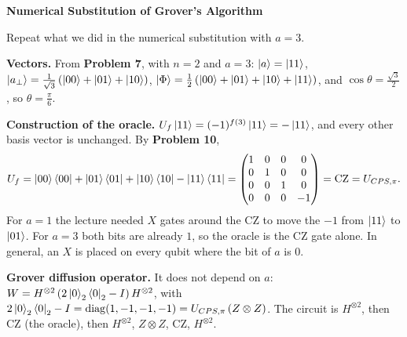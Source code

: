 \documentclass[a4paper, 10pt]{article}
\begin{document}
\begin{problem}
\textbf{Numerical Substitution of Grover's Algorithm}
\par Repeat what we did in the numerical substitution with \( a = 3 \).
\end{problem}

\begin{solution}
	\noindent \textbf{Vectors.} From \textbf{Problem 7}, with \( n = 2 \) and \( a = 3 \): \( \ket{a} = \ket{11} \), \( \ket{a_\perp} = \tfrac{1}{\sqrt{3}}\left(\ket{00} + \ket{01} + \ket{10}\right) \), \( \ket{\Phi} = \tfrac{1}{2}\left(\ket{00} + \ket{01} + \ket{10} + \ket{11}\right) \), and \( \cos\theta = \tfrac{\sqrt{3}}{2} \), so \( \theta = \tfrac{\pi}{6} \).

	\myspace

	\noindent \textbf{Construction of the oracle.} \( U_f\ket{11} = (-1)^{f(3)}\ket{11} = -\ket{11} \), and every other basis vector is unchanged. By \textbf{Problem 10},
	\[
		U_f = \ket{00}\bra{00} + \ket{01}\bra{01} + \ket{10}\bra{10} - \ket{11}\bra{11}
		= \begin{pmatrix}
			1 & 0 & 0 & 0  \\
			0 & 1 & 0 & 0  \\
			0 & 0 & 1 & 0  \\
			0 & 0 & 0 & -1
		\end{pmatrix} = \mathrm{CZ} = U_{CPS, \pi}.
	\]
	For \( a = 1 \) the lecture needed \( X \) gates around the CZ to move the \( -1 \) from \( \ket{11} \) to \( \ket{01} \). For \( a = 3 \) both bits are already \( 1 \), so the oracle is the CZ gate alone.
	In general, an \( X \) is placed on every qubit where the bit of \( a \) is \( 0 \).

	\myspace

	\noindent \textbf{Grover diffusion operator.} It does not depend on \( a \): \( W = H^{\otimes 2}\left(2\ket{0}_2\bra{0}_2 - I\right)H^{\otimes 2} \), with \( 2\ket{0}_2\bra{0}_2 - I = \mathrm{diag}(1, -1, -1, -1) = U_{CPS, \pi}\left(Z \otimes Z\right) \).
	The circuit is \( H^{\otimes 2} \), then CZ (the oracle), then \( H^{\otimes 2} \), \( Z \otimes Z \), CZ, \( H^{\otimes 2} \).

	\myspace


\end{solution}
\end{document}
